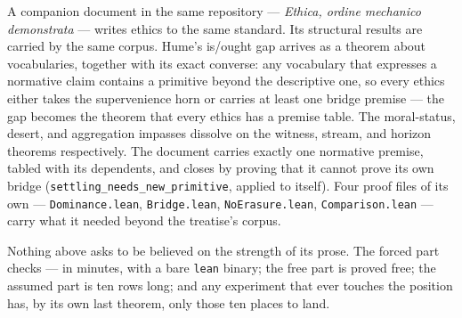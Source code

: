 \documentclass[11pt]{article}
\theoremstyle{remark}
\newcommand{\lf}[1]{\texttt{#1}}       %
\begin{document}
A companion document in the same repository --- \emph{Ethica, ordine mechanico demonstrata} --- writes ethics to the same standard. Its structural results are carried by the same corpus. Hume's is/ought gap \cite{hume1739} arrives as a theorem about vocabularies, together with its exact converse: any vocabulary that expresses a normative claim contains a primitive beyond the descriptive one, so every ethics either takes the supervenience horn or carries at least one bridge premise --- the gap becomes the theorem that every ethics has a premise table. The moral-status, desert, and aggregation impasses dissolve on the witness, stream, and horizon theorems respectively. The document carries exactly one normative premise, tabled with its dependents, and closes by proving that it cannot prove its own bridge (\lf{settling\_needs\_new\_primitive}, applied to itself). Four proof files of its own --- \lf{Dominance.lean}, \lf{Bridge.lean}, \lf{NoErasure.lean}, \lf{Comparison.lean} --- carry what it needed beyond the treatise's corpus.

Nothing above asks to be believed on the strength of its prose. The forced part checks --- in minutes, with a bare \lf{lean} binary; the free part is proved free; the assumed part is ten rows long; and any experiment that ever touches the position has, by its own last theorem, only those ten places to land.
\end{document}
